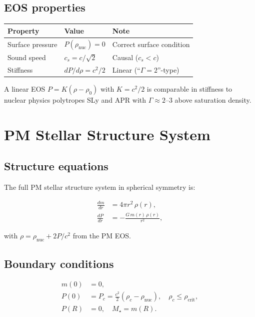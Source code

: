 \documentclass[11pt,a4paper]{article}
\newcommand{\rhonuc}{\rho_\text{nuc}}
\newcommand{\rhocrit}{\rho_\text{crit}}
\begin{document}
\subsection{EOS properties}

\begin{center}
\begin{tabular}{lll}
  \toprule
  Property & Value & Note \\
  \midrule
  Surface pressure & $P(\rhonuc) = 0$ & Correct surface condition \\
  Sound speed & $c_s = c/\!\sqrt{2}$ & Causal ($c_s < c$) \\
  Stiffness & $dP/d\rho = c^2/2$ & Linear (``$\Gamma = 2$''-type) \\
  \bottomrule
\end{tabular}
\end{center}

A linear EOS $P = K(\rho - \rho_0)$ with $K = c^2/2$ is comparable in
stiffness to nuclear physics polytropes SLy and APR with $\Gamma \approx
2$--$3$ above saturation density.

\section{PM Stellar Structure System}

\subsection{Structure equations}

The full PM stellar structure system in spherical symmetry is:

\begin{align}
  \frac{dm}{dr} &= 4\pi r^2\,\rho(r),  \label{eq:dmdr} \\[6pt]
  \frac{dP}{dr} &= -\frac{G\,m(r)\,\rho(r)}{r^2},  \label{eq:dPdr2}
\end{align}

with $\rho = \rhonuc + 2P/c^2$ from the PM EOS.

\subsection{Boundary conditions}

\begin{align}
  m(0) &= 0,  \\
  P(0) &= P_c = \tfrac{c^2}{2}(\rho_c - \rhonuc), \quad \rho_c \le \rhocrit, \\
  P(R) &= 0,  \quad M_\star = m(R).
\end{align}
\end{document}
